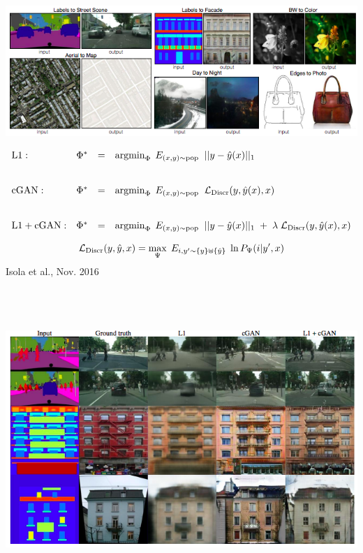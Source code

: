 {\centerline{\includegraphics[width = 8.0in]{../images/cGAN0}}


{\huge
$$\begin{array}{lrcl}
\mathrm{L1:} & \Phi^* & = & \operatorname*{argmin}_\Phi\;E_{(x,y) \sim \mathrm{pop}}\;\; ||y - \hat{y}(x)||_1 \\
\\
\\
\mathrm{cGAN:} & \Phi^* & = & \operatorname*{argmin}_\Phi\;E_{(x,y) \sim \mathrm{pop}}\;\; {\cal L}_{\mathrm{Discr}}(y,\hat{y}(x),x) \\
\\
\\
\mathrm{L1 + cGAN:} & \Phi^* & = & \operatorname*{argmin}_\Phi\;E_{(x,y) \sim \mathrm{pop}}\;\; ||y - \hat{y}(x)||_1\; +\; \lambda\; {\cal L}_{\mathrm{Discr}}(y,\hat{y}(x),x)
\end{array}$$
}


$${\cal L}_{\mathrm{Discr}}(y,\hat{y},x) = \max_\Psi \;E_{i,y' \sim \{y\}\uplus \{\hat{y}\}}\; \ln P_\Psi(i|y',x)$$
{Isola et al., Nov. 2016}

\centerline{\includegraphics[height = 4.5in]{../images/cGAN1}}

}
